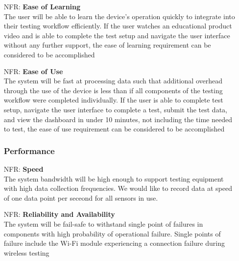 \documentclass[12pt]{article}
\newcounter{nfrnum} %
\begin{document}
\noindent\begin{itemize}

\subsubsection{Usability} 

    \item[NFR\refstepcounter{nfrnum}\thenfrnum:]
    \textbf{Ease of Learning}\\
    The user will be able to learn the device's operation quickly to integrate into their testing workflow efficiently. If the user watches an educational product video and is able to complete the test setup and navigate the user interface without any further support, the ease of learning requirement can be considered to be accomplished

    \item[NFR\refstepcounter{nfrnum}\thenfrnum:]
    \textbf{Ease of Use}\\
    The system will be fast at processing data such that additional overhead through the use of the device is less than if all components of the testing workflow were completed individually. If the user is able to complete test setup, navigate the user interface to complete a test, submit the test data, and view the dashboard in under 10 minutes, not including the time needed to test, the ease of use requirement can be considered to be accomplished

\subsubsection{Performance} 

    \item[NFR\refstepcounter{nfrnum}\thenfrnum:]
    \textbf{Speed}\\
    The system bandwidth will be high enough to support testing equipment with high data collection frequencies. We would like to record data at speed of one data point per seceond for all sensors in use.

    \item[NFR\refstepcounter{nfrnum}\thenfrnum:]
    \textbf{Reliability and Availability}\\
    The system will be fail-safe to withstand single point of failures in components with high probability of operational failure. Single points of failure include the Wi-Fi module experiencing a connection failure during wireless testing


\end{itemize}
\end{document}
